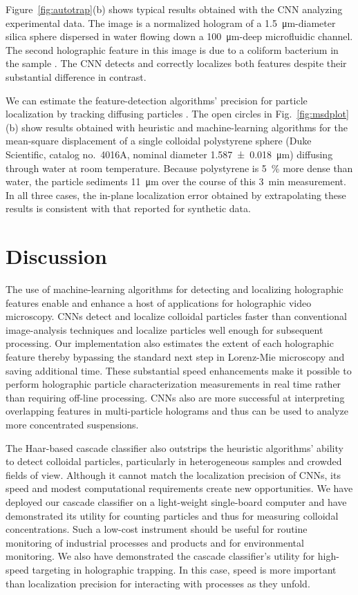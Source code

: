 Figure~\ref{fig:autotrap}(b) shows typical results obtained with
the CNN analyzing experimental data.  The image
is a normalized hologram of a
\SI{1.5}{\um}-diameter silica sphere dispersed in water
flowing down a \SI{100}{\um}-deep microfluidic channel.
The second holographic feature in this image is due
to a coliform bacterium in the sample \cite{philips17}.
The CNN detects and correctly localizes
both features despite their substantial
difference in contrast.

We can estimate the feature-detection algorithms' precision
for particle localization by tracking diffusing particles
\cite{crocker96}.
The open circles in Fig.~\ref{fig:msdplot}(b) show results obtained
with heuristic and machine-learning algorithms for the
mean-square displacement of a single colloidal polystyrene sphere
(Duke Scientific, catalog no.\ 4016A, nominal diameter
\SI{1.587+-0.018}{\um}) diffusing through water at
room temperature.
Because polystyrene is \SI{5}{\percent} more dense than water,
the particle sediments \SI{11}{\um} over the course of this
\SI{3}{\minute} measurement.
In all three cases, the in-plane localization error obtained
by extrapolating these results is consistent with that
reported for synthetic data.

\section{Discussion}

The use of machine-learning algorithms for detecting and
localizing holographic features enable and enhance a host of 
applications for holographic video microscopy.
CNNs detect and localize colloidal
particles faster than conventional image-analysis techniques
and localize particles well enough for subsequent processing.
Our implementation also estimates the extent of each holographic feature 
thereby bypassing the standard next step in Lorenz-Mie microscopy
\cite{cheong09} and saving additional time.
These substantial speed enhancements make it possible to
perform holographic particle characterization measurements in real
time rather than requiring off-line processing.
CNNs also are more successful at
interpreting overlapping features in multi-particle
holograms and thus can be used to analyze more concentrated
suspensions.

The Haar-based cascade classifier also outstrips the heuristic algorithms'
ability to detect colloidal particles, particularly in heterogeneous
samples and crowded fields of view.
Although it cannot match the localization precision of CNNs,
its speed and modest computational requirements
create new opportunities.
We have deployed our cascade classifier on a light-weight
single-board computer and have demonstrated its utility for counting particles
and thus for measuring colloidal concentrations.
Such a low-cost instrument should be useful for routine monitoring of
industrial processes and products and for environmental monitoring.
We also have demonstrated the cascade classifier's utility for
high-speed targeting in holographic trapping.  In this case, speed
is more important than localization precision for interacting with
processes as they unfold.

